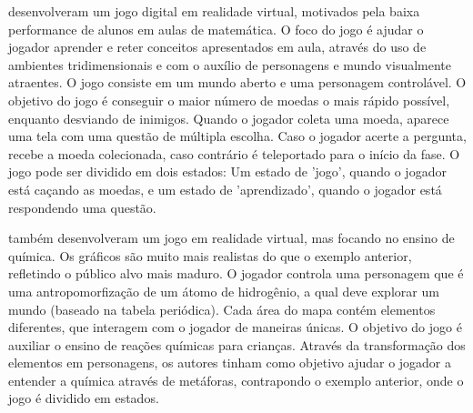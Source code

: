 \cite{SBGames:2015:RVAM} desenvolveram um jogo digital em realidade 
virtual, motivados pela baixa performance de alunos em aulas de matemática. 
O foco do jogo é ajudar o jogador aprender e reter conceitos apresentados 
em aula, através do uso de ambientes tridimensionais e com o auxílio de 
personagens e mundo visualmente atraentes. O jogo consiste em um mundo 
aberto e uma personagem controlável. O objetivo do jogo é conseguir o 
maior número de moedas o mais rápido possível, enquanto desviando de 
inimigos. Quando o jogador coleta uma moeda, aparece uma tela com uma questão 
de múltipla escolha. Caso o jogador acerte a pergunta, recebe a moeda 
colecionada, caso contrário é teleportado para o início da fase. O jogo pode 
ser dividido em dois estados: Um estado de 'jogo', quando o jogador está 
caçando as moedas, e um estado de 'aprendizado', quando o jogador está 
respondendo uma questão.

\cite{Alves:2015:VR_Quimica} também desenvolveram um jogo em realidade 
virtual, mas focando no ensino de química. Os gráficos são muito mais 
realistas do que o exemplo anterior, refletindo o público alvo mais 
maduro. O jogador controla uma personagem que é uma antropomorfização 
de um átomo de hidrogênio, a qual deve explorar um mundo (baseado 
na tabela periódica). Cada área do mapa contém elementos 
diferentes, que interagem com o jogador de maneiras únicas. O objetivo 
do jogo é auxiliar o ensino de reações químicas para crianças. Através 
da transformação dos elementos em personagens, os autores tinham como 
objetivo ajudar o jogador a entender a química através de metáforas, 
contrapondo o exemplo anterior, onde o jogo é dividido em estados.
